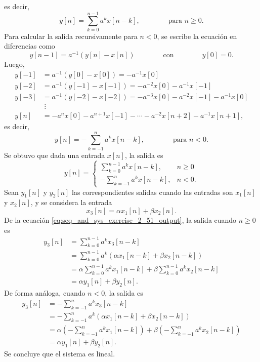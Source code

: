 \documentclass[a4paper]{report}
\begin{document}
es decir,
\[
 y[n]=\sum_{k=0}^{n-1}a^kx[n-k],
 \qquad\qquad\textrm{para }n\geq0.
\]
Para calcular la salida recursivamente para \(n<0\), se escribe la ecuación en diferencias como
\[
 y[n-1]=a^{-1}(y[n]-x[n])
 \qquad\qquad\textrm{con}\qquad\qquad
 y[0]=0.
\]
Luego,
\begin{align*}
  y[-1]&=a^{-1}(y[0]-x[0])=-a^{-1}x[0]\\
  y[-2]&=a^{-1}(y[-1]-x[-1])=-a^{-2}x[0]-a^{-1}x[-1]\\
  y[-3]&=a^{-1}(y[-2]-x[-2])=-a^{-3}x[0]-a^{-2}x[-1]-a^{-1}x[0]\\
  &\;\vdots\\
  y[n]&=-a^{n}x[0]-a^{n+1}x[-1]-\cdots-a^{-2}x[n+2]-a^{-1}x[n+1],
\end{align*}
es decir,
\[
 y[n]=-\sum_{k=-1}^{n}a^kx[n-k],
 \qquad\qquad\textrm{para }n<0.
\] 
Se obtuvo que dada una entrada \(x[n]\), la salida es
\begin{equation}\label{eq:seq_and_sys_exercise_2_51_output}
 y[n]=
 \left\{ 
 \begin{array}{ll}
  \displaystyle\sum_{k=0}^{n-1}a^kx[n-k],&n\geq0\\
  \displaystyle-\sum_{k=-1}^{n}a^kx[n-k],&n<0.
 \end{array}
 \right. 
\end{equation}
Sean \(y_1[n]\) y \(y_2[n]\) las correspondientes salidas cuando las entradas son \(x_1[n]\) y  \(x_2[n]\), y se considera la entrada
\[
 x_3[n]=\alpha x_1[n]+\beta x_2[n].
\]
De la ecuación \ref{eq:seq_and_sys_exercise_2_51_output}, la salida cuando \(n\geq0\) es
\begin{align*}
 y_3[n]&=\sum_{k=0}^{n-1}a^kx_3[n-k]\\
  &=\sum_{k=0}^{n-1}a^k(\alpha x_1[n-k]+\beta x_2[n-k])\\
  &=\alpha\sum_{k=0}^{n-1}a^kx_1[n-k]+\beta\sum_{k=0}^{n-1}a^kx_2[n-k]\\
  &=\alpha y_1[n]+\beta y_2[n].
\end{align*}
De forma análoga, cuando \(n<0\), la salida es
\begin{align*}
 y_3[n]&=-\sum_{k=-1}^{n}a^kx_3[n-k]\\
  &=-\sum_{k=-1}^{n}a^k(\alpha x_1[n-k]+\beta x_2[n-k])\\
  &=\alpha\left(-\sum_{k=-1}^{n}a^kx_1[n-k]\right)+\beta\left(-\sum_{k=-1}^{n}a^kx_2[n-k]\right)\\
  &=\alpha y_1[n]+\beta y_2[n].
\end{align*}
Se concluye que el sistema es lineal.
 
\end{document}
